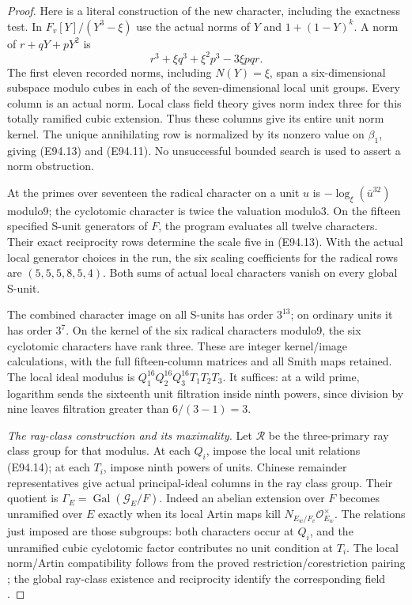 \begin{proof}
Here is a literal construction of the new character,
including the exactness test. In
\(F_v[Y]/(Y^3-\xi)\) use the actual norms of \(Y\)
and \(1+(1-Y)^k\). A norm of
\(r+qY+pY^2\) is
\[
 r^3+\xi q^3+\xi^2p^3-3\xi pqr .
 \tag{E94.15}
\]
The first eleven recorded norms, including
\(N(Y)=\xi\), span a six-dimensional subspace
modulo cubes in each of the seven-dimensional
local unit groups. Every column is an actual
norm. Local class field theory gives norm index
three for this totally ramified cubic extension.
Thus these columns give its entire unit norm
kernel. The unique annihilating row is normalized
by its nonzero value on \(\beta_1\), giving
(E94.13) and (E94.11). No unsuccessful bounded
search is used to assert a norm obstruction.

At the primes over seventeen the radical character
on a unit \(u\) is
\(-\log_\xi(\bar u^{32})\) modulo9; the cyclotomic
character is twice the valuation modulo3. On the
fifteen specified S-unit generators of \(F\),
the program evaluates all twelve characters.
Their exact reciprocity rows determine the scale
five in (E94.13). With the actual local generator
choices in the run, the six scaling coefficients
for the radical rows are
\((5,5,5,8,5,4)\). Both sums of actual local
characters vanish on every global S-unit.

The combined character image on all S-units has
order \(3^{13}\); on ordinary units it has order
\(3^7\). On the kernel of the six radical
characters modulo9, the six cyclotomic
characters have rank three. These are integer
kernel/image calculations, with the full
fifteen-column matrices and all Smith maps
retained. The local ideal modulus is
\(Q_1^{16}Q_2^{16}Q_3^{16}T_1T_2T_3\).
It suffices: at a wild prime, logarithm sends
the sixteenth unit filtration inside ninth
powers, since division by nine leaves
filtration greater than \(6/(3-1)=3\).

\emph{The ray-class construction and its maximality.}
Let \(\mathcal R\) be the three-primary ray class
group for that modulus. At each \(Q_i\), impose
the local unit relations (E94.14); at each \(T_i\),
impose ninth powers of units. Chinese remainder
representatives give actual principal-ideal
columns in the ray class group. Their quotient
is \(\Gamma_E=\operatorname{Gal}(\mathcal G_E/F)\).
Indeed an abelian extension over \(F\) becomes
unramified over \(E\) exactly when its local
Artin maps kill \(N_{E_w/F_v}\mathcal O_{E_w}^\times\).
The relations just imposed are those subgroups:
both characters occur at \(Q_i\), and the
unramified cubic cyclotomic factor contributes
no unit condition at \(T_i\).
The local norm/Artin compatibility follows from
the proved restriction/corestriction pairing
\cite[III,Theorem3.1]{E_MilneCFT}; the global
ray-class existence and reciprocity identify
the corresponding field
\cite[V,Theorems3.5--3.6]{E_MilneCFT}.


\end{proof}
